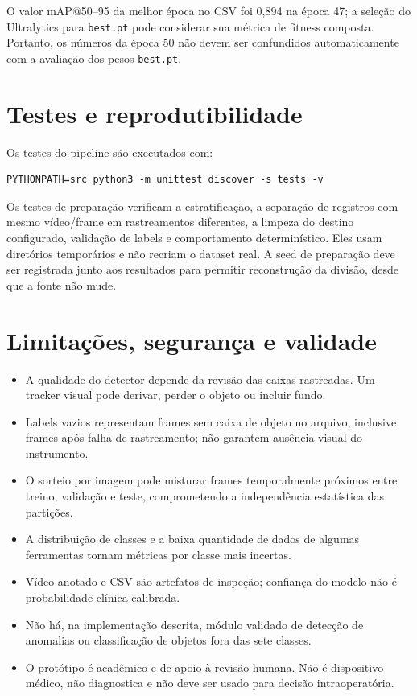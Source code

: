 \documentclass[12pt,a4paper]{article}
\begin{document}
O valor mAP@50--95 da melhor época no CSV foi 0,894 na época 47; a seleção do Ultralytics para \texttt{best.pt} pode considerar sua métrica de fitness composta. Portanto, os números da época 50 não devem ser confundidos automaticamente com a avaliação dos pesos \texttt{best.pt}.

\section{Testes e reprodutibilidade}

Os testes do pipeline são executados com:

\begin{lstlisting}[style=terminal]
PYTHONPATH=src python3 -m unittest discover -s tests -v
\end{lstlisting}

Os testes de preparação verificam a estratificação, a separação de registros com mesmo vídeo/frame em rastreamentos diferentes, a limpeza do destino configurado, validação de labels e comportamento determinístico. Eles usam diretórios temporários e não recriam o dataset real. A seed de preparação deve ser registrada junto aos resultados para permitir reconstrução da divisão, desde que a fonte não mude.

\section{Limitações, segurança e validade}

\begin{itemize}
  \item A qualidade do detector depende da revisão das caixas rastreadas. Um tracker visual pode derivar, perder o objeto ou incluir fundo.
  \item Labels vazios representam frames sem caixa de objeto no arquivo, inclusive frames após falha de rastreamento; não garantem ausência visual do instrumento.
  \item O sorteio por imagem pode misturar frames temporalmente próximos entre treino, validação e teste, comprometendo a independência estatística das partições.
  \item A distribuição de classes e a baixa quantidade de dados de algumas ferramentas tornam métricas por classe mais incertas.
  \item Vídeo anotado e CSV são artefatos de inspeção; confiança do modelo não é probabilidade clínica calibrada.
  \item Não há, na implementação descrita, módulo validado de detecção de anomalias ou classificação de objetos fora das sete classes.
  \item O protótipo é acadêmico e de apoio à revisão humana. Não é dispositivo médico, não diagnostica e não deve ser usado para decisão intraoperatória.
\end{itemize}
\end{document}
